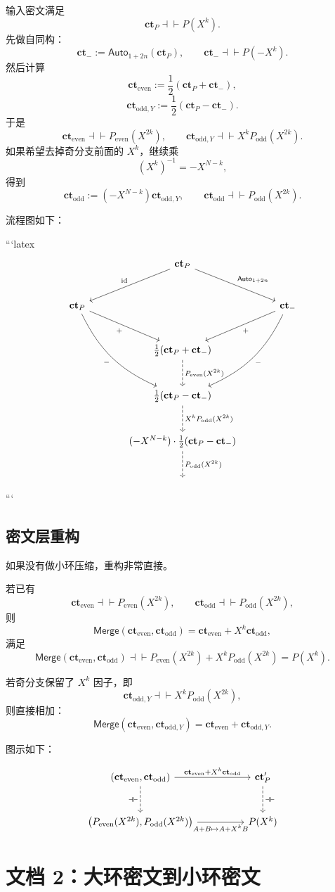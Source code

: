 \documentclass[11pt]{article}
\newcommand{\Pe}{P_{\mathrm{even}}}
\newcommand{\Po}{P_{\mathrm{odd}}}
\newcommand{\ct}{\mathbf{ct}}
\newcommand{\ctP}{\mathbf{ct}_P}
\newcommand{\cte}{\mathbf{ct}_{\mathrm{even}}}
\newcommand{\cto}{\mathbf{ct}_{\mathrm{odd}}}
\newcommand{\ctoy}{\mathbf{ct}_{\mathrm{odd},Y}}
\newcommand{\Merge}{\mathsf{Merge}}
\newcommand{\Auto}{\mathsf{Auto}}
\newcommand{\rep}{\mathrel{\dashv\vdash}}
\begin{document}
输入密文满足
\[
\ctP \rep P(X^k).
\]
先做自同构：
\[
\ct_-:=\Auto_{1+2n}(\ctP),
\qquad
\ct_-\rep P(-X^k).
\]
然后计算
\[
\cte:=\frac{1}{2}(\ctP+\ct_-),
\]
\[
\ctoy:=\frac{1}{2}(\ctP-\ct_-).
\]
于是
\[
\cte\rep \Pe(X^{2k}),
\qquad
\ctoy\rep X^k\Po(X^{2k}).
\]
如果希望去掉奇分支前面的 $X^k$，继续乘
\[
(X^k)^{-1}=-X^{N-k},
\]
得到
\[
\cto:=(-X^{N-k})\ctoy,
\qquad
\cto\rep \Po(X^{2k}).
\]

流程图如下：

```latex
\[
\begin{tikzcd}[column sep=large,row sep=large]
& \ctP
  \arrow[dl, "\mathrm{id}"']
  \arrow[dr, "\Auto_{1+2n}"]
&
\\
\ctP
  \arrow[dr, "+"']
  \arrow[ddr, "-"', bend right=20]
&
&
\ct_{-}
  \arrow[dl, "+"]
  \arrow[ddl, "-", bend left=20]
\\
&
\frac{1}{2}(\ctP+\ct_{-})
  \arrow[d, dashed, "\Pe(X^{2k})"]
&
\\
&
\frac{1}{2}(\ctP-\ct_{-})
  \arrow[d, dashed, "X^k\Po(X^{2k})"]
&
\\
&
(-X^{N-k})\cdot \frac{1}{2}(\ctP-\ct_{-})
  \arrow[d, dashed, "\Po(X^{2k})"]
&
\\
& {} &
\end{tikzcd}
\]
```

\subsection{密文层重构}

如果没有做小环压缩，重构非常直接。

若已有
\[
\cte\rep \Pe(X^{2k}),
\qquad
\cto\rep \Po(X^{2k}),
\]
则
\[
\Merge(\cte,\cto)=\cte+X^k\cto,
\]
满足
\[
\Merge(\cte,\cto)\rep \Pe(X^{2k})+X^k\Po(X^{2k})=P(X^k).
\]

若奇分支保留了 $X^k$ 因子，即
\[
\ctoy\rep X^k\Po(X^{2k}),
\]
则直接相加：
\[
\Merge(\cte,\ctoy)=\cte+\ctoy.
\]

图示如下：

\[
\begin{tikzcd}[column sep=huge,row sep=large]
(\cte,\cto)
  \arrow[r,"\cte+X^k\cto"]
  \arrow[d,dashed,"\rep"']
&
\ct'_P
  \arrow[d,dashed,"\rep"]
\\
\bigl(\Pe(X^{2k}),\Po(X^{2k})\bigr)
  \arrow[r,"A+B\mapsto A+X^kB"']
&
P(X^k)
\end{tikzcd}
\]

\section{文档 2：大环密文到小环密文}
\end{document}

